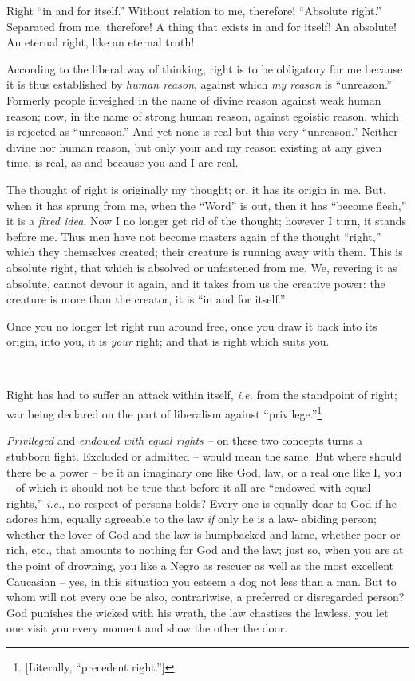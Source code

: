 \documentclass[12pt,a4paper]{book}
\begin{document}
Right ``in and for itself.'' Without relation to me, therefore! ``Absolute 
right.'' Separated from me, therefore! A thing that exists in and for itself! 
An absolute! An eternal right, like an eternal truth!

According to the liberal way of thinking, right is to be obligatory for me 
because it is thus established by \textit{human reason}, against which 
\textit{my reason} is ``unreason.'' Formerly people inveighed in the name of 
divine reason against weak human reason; now, in the name of strong human 
reason, against egoistic reason, which is rejected as ``unreason.'' And yet 
none is real but this very ``unreason.'' Neither divine nor human reason, 
but only your and my reason existing at any given time, is real, as and 
because you and I are real.

The thought of right is originally my thought; or, it has its origin in me. 
But, when it has sprung from me, when the ``Word'' is out, then it has 
``become flesh,'' it is a \textit{fixed idea}. Now I no longer get rid of 
the thought; however I turn, it stands before me. Thus men have not become 
masters again of the thought ``right,'' which they themselves created; their 
creature is running away with them. This is absolute right, that which is 
absolved or unfastened from me. We, revering it as absolute, cannot devour it 
again, and it takes from us the creative power: the creature is more than the 
creator, it is ``in and for itself.''

Once you no longer let right run around free, once you draw it back into its 
origin, into you, it is \textit{your} right; and that is right which suits 
you.

\begin{center}
--------\end{center}


Right has had to suffer an attack within itself, \textit{i.e.} from the 
standpoint of right; war being declared on the part of liberalism against 
``privilege.''\footnote{[Literally, ``precedent right.'']}

\textit{Privileged} and \textit{endowed with equal rights --} on these two 
concepts turns a stubborn fight. Excluded or admitted -- would mean the same. 
But where should there be a power -- be it an imaginary one like God, law, or 
a real one like I, you -- of which it should not be true that before it all 
are ``endowed with equal rights,'' \textit{i.e.}, no respect of persons 
holds? Every one is equally dear to God if he adores him, equally agreeable to 
the law \textit{if} only he is a law- abiding person; whether the lover of God 
and the law is humpbacked and lame, whether poor or rich, etc., that amounts 
to nothing for God and the law; just so, when you are at the point of 
drowning, you like a Negro as rescuer as well as the most excellent Caucasian 
-- yes, in this situation you esteem a dog not less than a man. But to whom 
will not every one be also, contrariwise, a preferred or disregarded person? 
God punishes the wicked with his wrath, the law chastises the lawless, you let 
one visit you every moment and show the other the door.
\end{document}
